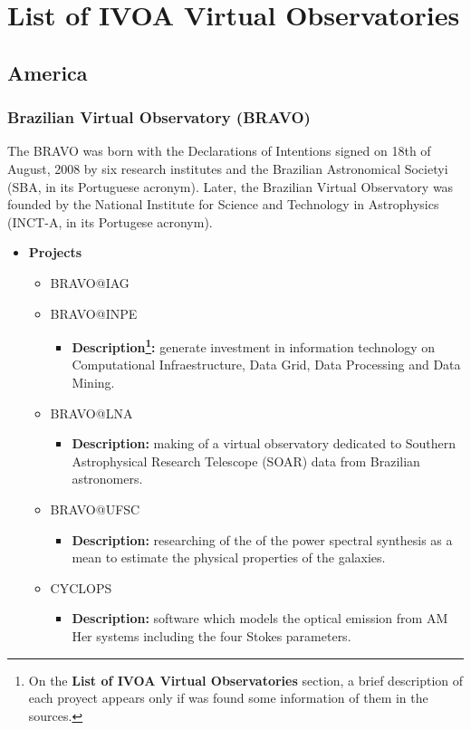 \section{List of IVOA Virtual Observatories}
\subsection{America}
\subsubsection{Brazilian Virtual Observatory (BRAVO)}
The BRAVO was born with the Declarations of Intentions signed on
18th of August, 2008 by six research institutes and the Brazilian Astronomical
Societyi (SBA, in its Portuguese acronym). Later, the Brazilian Virtual
Observatory was founded by the National Institute for Science and Technology in
Astrophysics (INCT-A, in its Portugese acronym).

\begin{itemize}
	\item \textbf{Projects}
	\begin{itemize}
		\item BRAVO@IAG
		\item BRAVO@INPE
			\begin{itemize}
				\item \textbf{Description\footnote{On the \textbf{List of IVOA
Virtual Observatories} section, a brief description of each proyect appears
only if was found some information of them in the sources.}:} generate
investment in information technology on Computational Infraestructure, Data
Grid, Data Processing and Data Mining.
			\end{itemize}
		\item BRAVO@LNA
			\begin{itemize}
				\item \textbf{Description:} making of a virtual observatory
dedicated to Southern Astrophysical Research Telescope (SOAR) data from
Brazilian astronomers.  
			\end{itemize}
		\item BRAVO@UFSC
			\begin{itemize}
				\item \textbf{Description:} researching of the of the power
spectral synthesis as a mean to estimate the physical properties of the
galaxies.
			\end{itemize}
		\item CYCLOPS
		\begin{itemize}
			\item \textbf{Description:} software which models the optical
emission from AM Her systems including the four Stokes parameters.
		\end{itemize}
	\end{itemize}
\end{itemize}

